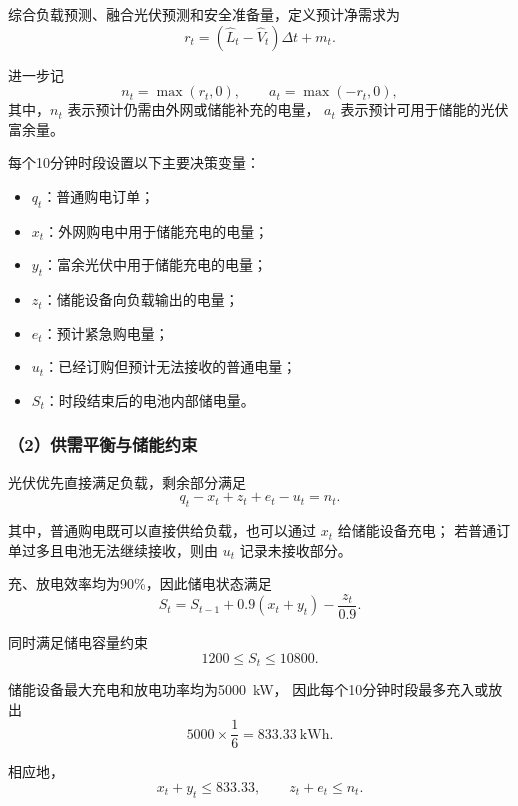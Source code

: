 综合负载预测、融合光伏预测和安全准备量，定义预计净需求为
\begin{equation}
r_t
=
(\widehat{L}_t-\widehat{V}_t)\Delta t+m_t.
\end{equation}

进一步记
\begin{equation}
n_t=\max(r_t,0),
\qquad
a_t=\max(-r_t,0),
\end{equation}
其中，$n_t$ 表示预计仍需由外网或储能补充的电量，
$a_t$ 表示预计可用于储能的光伏富余量。

每个10分钟时段设置以下主要决策变量：
\begin{itemize}
    \item $q_t$：普通购电订单；
    \item $x_t$：外网购电中用于储能充电的电量；
    \item $y_t$：富余光伏中用于储能充电的电量；
    \item $z_t$：储能设备向负载输出的电量；
    \item $e_t$：预计紧急购电量；
    \item $u_t$：已经订购但预计无法接收的普通电量；
    \item $S_t$：时段结束后的电池内部储电量。
\end{itemize}


\subsubsection*{（2）供需平衡与储能约束}

光伏优先直接满足负载，剩余部分满足
\begin{equation}
q_t-x_t+z_t+e_t-u_t=n_t.
\end{equation}

其中，普通购电既可以直接供给负载，也可以通过 $x_t$ 给储能设备充电；
若普通订单过多且电池无法继续接收，则由 $u_t$ 记录未接收部分。

充、放电效率均为90\%，因此储电状态满足
\begin{equation}
S_t
=
S_{t-1}
+
0.9(x_t+y_t)
-
\frac{z_t}{0.9}.
\end{equation}

同时满足储电容量约束
\begin{equation}
1200\leq S_t\leq10800.
\end{equation}

储能设备最大充电和放电功率均为5000~kW，
因此每个10分钟时段最多充入或放出
\[
5000\times\frac{1}{6}
=
833.33\ \mathrm{kWh}.
\]

相应地，
\begin{equation}
x_t+y_t\leq833.33,
\qquad
z_t+e_t\leq n_t.
\end{equation}

